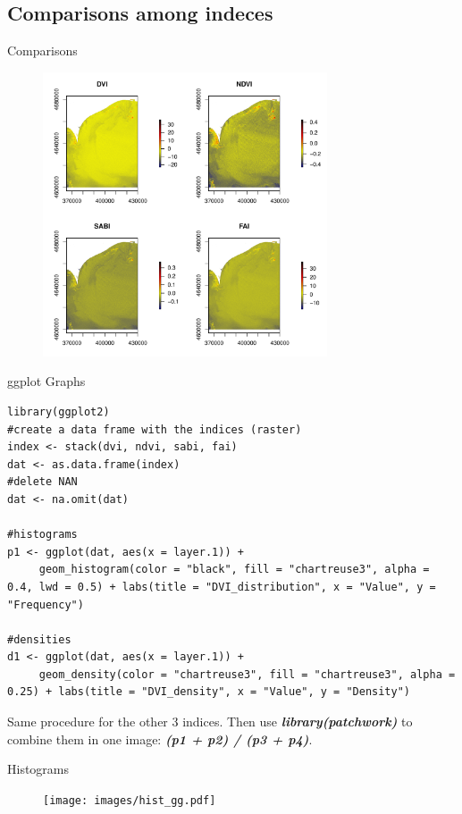 \documentclass[10pt]{beamer}
\begin{document}
\subsection{Comparisons among indeces}
\begin{frame}{Comparisons}
\begin{figure}
    \centering
    \includegraphics[width=0.75\textwidth]{images/confronto.pdf}
\end{figure}  
\end{frame}

\begin{frame}[fragile]{ggplot Graphs}
\begin{lstlisting}[firstnumber = 52]
library(ggplot2)
#create a data frame with the indices (raster)
index <- stack(dvi, ndvi, sabi, fai)
dat <- as.data.frame(index)
#delete NAN
dat <- na.omit(dat)

#histograms
p1 <- ggplot(dat, aes(x = layer.1)) + 
     geom_histogram(color = "black", fill = "chartreuse3", alpha = 0.4, lwd = 0.5) + labs(title = "DVI_distribution", x = "Value", y = "Frequency")

#densities
d1 <- ggplot(dat, aes(x = layer.1)) + 
     geom_density(color = "chartreuse3", fill = "chartreuse3", alpha = 0.25) + labs(title = "DVI_density", x = "Value", y = "Density")
\end{lstlisting}   
Same procedure for the other 3 indices. Then use \textit{\textbf{library(patchwork)}} to combine them in one image: \textit{\textbf{(p1 + p2) / (p3 + p4)}}.
\end{frame}

\begin{frame}{Histograms}
\begin{figure}
    \centering
    \texttt{[image: images/hist\_gg.pdf]}
\end{figure}  
\end{frame}
\end{document}
